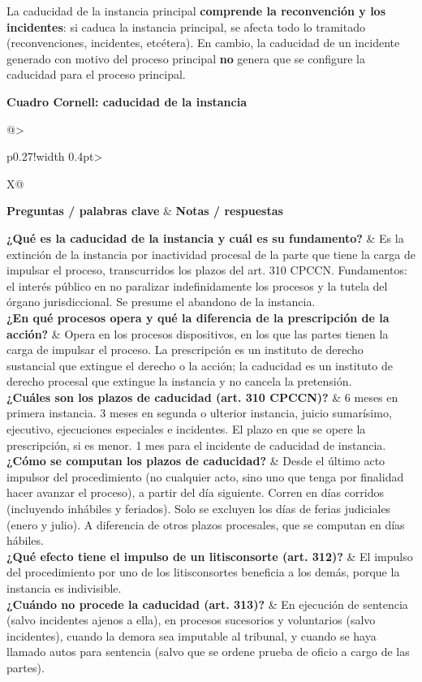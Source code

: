 \documentclass[12pt,oneside]{book}
\makeatletter
\newcommand{\cornelltitle}[1]{\par\bigskip\noindent\textbf{\sffamily Cuadro Cornell: #1}\par\nopagebreak\smallskip}
\newcommand{\cqrow}[2]{\textbf{#1} & #2 \\[0.5em]}
\newcommand{\cornellblock}[1]{%
  \noindent\begin{tabularx}{\textwidth}{@{}>{\raggedright\arraybackslash}p{0.27\textwidth}!{\vrule width 0.4pt}>{\raggedright\arraybackslash}X@{}}
  \toprule
  \textbf{Preguntas / palabras clave} & \textbf{Notas / respuestas} \\
  \midrule
  #1
  \bottomrule
  \end{tabularx}\par}
\makeatother
\begin{document}
La caducidad de la instancia principal \textbf{comprende la reconvención y los incidentes}: si caduca la instancia principal, se afecta todo lo tramitado (reconvenciones, incidentes, etcétera). En cambio, la caducidad de un incidente generado con motivo del proceso principal \textbf{no} genera que se configure la caducidad para el proceso principal.


\cornelltitle{caducidad de la instancia}
\cornellblock{
\cqrow{¿Qué es la caducidad de la instancia y cuál es su fundamento?}{Es la extinción de la instancia por inactividad procesal de la parte que tiene la carga de impulsar el proceso, transcurridos los plazos del art. 310 CPCCN. Fundamentos: el interés público en no paralizar indefinidamente los procesos y la tutela del órgano jurisdiccional. Se presume el abandono de la instancia.
}
\cqrow{¿En qué procesos opera y qué la diferencia de la prescripción de la acción?}{Opera en los procesos dispositivos, en los que las partes tienen la carga de impulsar el proceso. La prescripción es un instituto de derecho sustancial que extingue el derecho o la acción; la caducidad es un instituto de derecho procesal que extingue la instancia y no cancela la pretensión.
}
\cqrow{¿Cuáles son los plazos de caducidad (art. 310 CPCCN)?}{6 meses en primera instancia. 3 meses en segunda o ulterior instancia, juicio sumarísimo, ejecutivo, ejecuciones especiales e incidentes. El plazo en que se opere la prescripción, si es menor. 1 mes para el incidente de caducidad de instancia.
}
\cqrow{¿Cómo se computan los plazos de caducidad?}{Desde el último acto impulsor del procedimiento (no cualquier acto, sino uno que tenga por finalidad hacer avanzar el proceso), a partir del día siguiente. Corren en días corridos (incluyendo inhábiles y feriados). Solo se excluyen los días de ferias judiciales (enero y julio). A diferencia de otros plazos procesales, que se computan en días hábiles.
}
\cqrow{¿Qué efecto tiene el impulso de un litisconsorte (art. 312)?}{El impulso del procedimiento por uno de los litisconsortes beneficia a los demás, porque la instancia es indivisible.
}
\cqrow{¿Cuándo no procede la caducidad (art. 313)?}{En ejecución de sentencia (salvo incidentes ajenos a ella), en procesos sucesorios y voluntarios (salvo incidentes), cuando la demora sea imputable al tribunal, y cuando se haya llamado autos para sentencia (salvo que se ordene prueba de oficio a cargo de las partes).
}
}
\medskip
\end{document}
